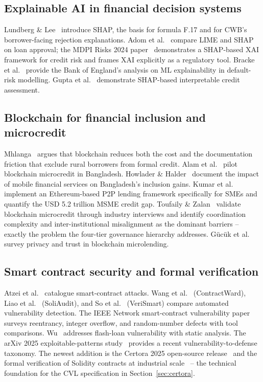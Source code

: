 \documentclass[12pt,a4paper]{report}
\begin{document}
\subsection{Explainable AI in financial decision systems}
Lundberg \& Lee~\cite{lundberg2017shap} introduce SHAP, the basis for formula F.17 and for CWB's borrower-facing rejection explanations. Adom et al.~\cite{adom2022limeShap} compare LIME and SHAP on loan approval; the MDPI Risks 2024 paper~\cite{xaiCreditRisk2024} demonstrates a SHAP-based XAI framework for credit risk and frames XAI explicitly as a regulatory tool. Bracke et al.~\cite{bracke2019mlfinance} provide the Bank of England's analysis on ML explainability in default-risk modelling. Gupta et al.~\cite{gupta2024shapCredit} demonstrate SHAP-based interpretable credit assessment.

\subsection{Blockchain for financial inclusion and microcredit}
Mhlanga~\cite{mhlanga2022blockchain} argues that blockchain reduces both the cost and the documentation friction that exclude rural borrowers from formal credit. Alam et al.~\cite{alam2021microcredit} pilot blockchain microcredit in Bangladesh. Howlader \& Halder~\cite{howlader2025bangladesh} document the impact of mobile financial services on Bangladesh's inclusion gains. Kumar et al.~\cite{kumar2023p2pSme} implement an Ethereum-based P2P lending framework specifically for SMEs and quantify the USD 5.2 trillion MSME credit gap. Toufaily \& Zalan~\cite{toufaily2024microcredit} validate blockchain microcredit through industry interviews and identify coordination complexity and inter-institutional misalignment as the dominant barriers -- exactly the problem the four-tier governance hierarchy addresses. G\"uc\"uk et al.~\cite{gucuk2024microlending} survey privacy and trust in blockchain microlending.

\subsection{Smart contract security and formal verification}
Atzei et al.~\cite{atzei2017sok} catalogue smart-contract attacks. Wang et al.~\cite{wang2020contractward} (ContractWard), Liao et al.~\cite{liao2019soliaudit} (SoliAudit), and So et al.~\cite{so2020verismart} (VeriSmart) compare automated vulnerability detection. The IEEE Network smart-contract vulnerability paper~\cite{smartContractVuln2020} surveys reentrancy, integer overflow, and random-number defects with tool comparisons. Wu~\cite{wu2024flashLoan} addresses flash-loan vulnerability with static analysis. The arXiv 2025 exploitable-patterns study~\cite{exploitablePatterns2025} provides a recent vulnerability-to-defense taxonomy. The newest addition is the Certora 2025 open-source release~\cite{certoraOpenSource2025} and the formal verification of Solidity contracts at industrial scale~\cite{certora2023formal} -- the technical foundation for the CVL specification in Section~\ref{sec:certora}.
\end{document}
